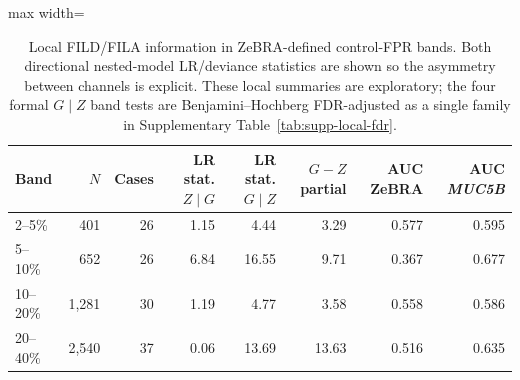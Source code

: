 \begin{table}[!t]
\caption{Local FILD/FILA information in ZeBRA-defined control-FPR bands. Both directional nested-model LR/deviance statistics are shown so the asymmetry between channels is explicit. These local summaries are exploratory; the four formal $G\mid Z$ band tests are Benjamini--Hochberg FDR-adjusted as a single family in Supplementary Table~\ref{tab:supp-local-fdr}.}
\label{tab:local-info}
\centering\scriptsize
\setlength{\tabcolsep}{3.5pt}
\renewcommand{\arraystretch}{1.08}
\begin{adjustbox}{max width=\textwidth}
\begin{tabular}{lrrrrrrr}
\toprule
Band & $N$ & Cases & LR stat. $Z\mid G$ & LR stat. $G\mid Z$ & $G{-}Z$ partial & AUC ZeBRA & AUC \textit{MUC5B}\\
\midrule
2--5\% & 401 & 26 & 1.15 & 4.44 & 3.29 & 0.577 & 0.595\\
5--10\% & 652 & 26 & 6.84 & 16.55 & 9.71 & 0.367 & 0.677\\
10--20\% & 1,281 & 30 & 1.19 & 4.77 & 3.58 & 0.558 & 0.586\\
20--40\% & 2,540 & 37 & 0.06 & 13.69 & 13.63 & 0.516 & 0.635\\
\bottomrule
\end{tabular}
\end{adjustbox}
\end{table}
